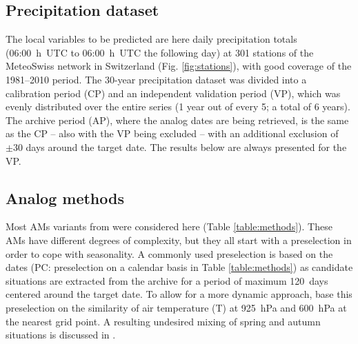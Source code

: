 \documentclass[alpha-refs]{wiley-article}
\begin{document}
\subsection{Precipitation dataset}
\label{sec:precipitation}

The local variables to be predicted are here daily precipitation totals (06:00~h~UTC to 06:00~h~UTC the following day) at 301 stations of the MeteoSwiss network in Switzerland (Fig. \ref{fig:stations}), with good coverage of the 1981--2010 period. The 30-year precipitation dataset was divided into a calibration period (CP) and an independent validation period (VP), which was evenly distributed over the entire series (1 year out of every 5; a total of 6 years). The archive period (AP), where the analog dates are being retrieved, is the same as the CP -- also with the VP being excluded -- with an additional exclusion of $\pm30$ days around the target date. The results below are always presented for the VP.


\subsection{Analog methods}
\label{sec:ams}

Most AMs variants from \cite{Horton2018b} were considered here (Table \ref{table:methods}). These AMs have different degrees of complexity, but they all start with a preselection in order to cope with seasonality. A commonly used preselection is based on the dates (PC: preselection on a calendar basis in Table \ref{table:methods}) as candidate situations are extracted from the archive for a period of maximum 120~days centered around the target date. To allow for a more dynamic approach, \citet{BenDaoud2016} base this preselection on the similarity of air temperature (T) at 925~hPa and 600~hPa at the nearest grid point. A resulting undesired mixing of spring and autumn situations is discussed in \citet{Caillouet2016}. 
\end{document}
